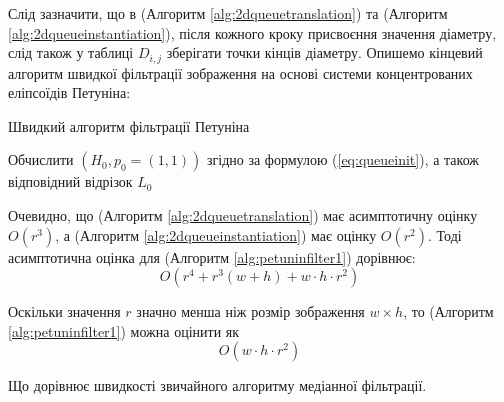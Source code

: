 \par
Слід зазначити, що в (Алгоритм \ref{alg:2dqueuetranslation}) та (Алгоритм \ref{alg:2dqueueinstantiation}), після кожного кроку присвоєння значення діаметру, слід також у таблиці \(D_{i, j}\) зберігати точки кінців діаметру. Опишемо кінцевий алгоритм швидкої фільтрації зображення на основі системи концентрованих еліпсоїдів Петуніна:

\begin{megaalgorithm}[H] \label{alg:petuninfilter1}
	\caption{Швидкий алгоритм фільтрації Петуніна}
	
	\BlankLine 
	
	Обчислити \((H_0, p_0 = (1, 1))\) згідно за формулою (\ref{eq:queueinit}), а також відповідний відрізок \(L_0\)\;

\end{megaalgorithm}

\par
Очевидно, що (Алгоритм \ref{alg:2dqueuetranslation}) має асимптотичну оцінку \(O\left( r^3 \right)\), а (Алгоритм \ref{alg:2dqueueinstantiation}) має оцінку \(O\left(r^2\right)\). Тоді асимптотична оцінка для (Алгоритм \ref{alg:petuninfilter1}) дорівнює:
\begin{equation*}
O\left(
r^4 + r^3 \left(w + h\right) + w \cdot h \cdot r^2
\right)
\end{equation*}

Оскільки значення \(r\) значно менша ніж розмір зображення \(w \times h\), то (Алгоритм \ref{alg:petuninfilter1}) можна оцінити як
\begin{equation*}
O\left(w \cdot h \cdot r^2\right)
\end{equation*}

Що дорівнює швидкості звичайного алгоритму медіанної фільтрації.